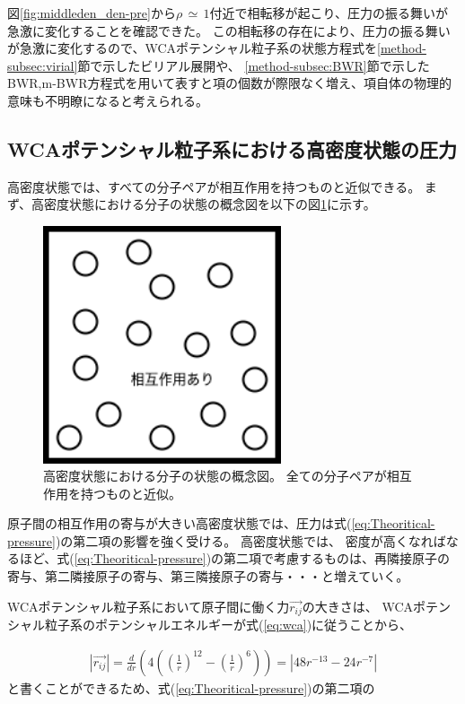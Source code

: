 \documentclass[titlepage]{jsreport}
\begin{document}
{{{図\ref{fig:middleden_den-pre}から$\rho\,{\simeq}\,1$付近で相転移が起こり、圧力の振る舞いが急激に変化することを確認できた。
この相転移の存在により、圧力の振る舞いが急激に変化するので、WCAポテンシャル粒子系の状態方程式を\ref{method-subsec:virial}節で示したビリアル展開や、
\ref{method-subsec:BWR}節で示したBWR,m-BWR方程式を用いて表すと項の個数が際限なく増え、項自体の物理的意味も不明瞭になると考えられる。

\newpage
\subsection{WCAポテンシャル粒子系における高密度状態の圧力}\label{results-subsec:WCA-press-high-density}
高密度状態では、すべての分子ペアが相互作用を持つものと近似できる。
まず、高密度状態における分子の状態の概念図を以下の図\ref{fig:highdensity.png}に示す。

\begin{figure}[htbp]
    \begin{center}
        \includegraphics[width=7cm]{fig/highdensity.png}
    \end{center}
    \caption{高密度状態における分子の状態の概念図。
    全ての分子ペアが相互作用を持つものと近似。}
    \label{fig:highdensity.png}
\end{figure}


原子間の相互作用の寄与が大きい高密度状態では、圧力は式(\ref{eq:Theoritical-pressure})の第二項の影響を強く受ける。
高密度状態では、
密度が高くなればなるほど、式(\ref{eq:Theoritical-pressure})の第二項で考慮するものは、再隣接原子の寄与、第二隣接原子の寄与、第三隣接原子の寄与・・・と増えていく。

WCAポテンシャル粒子系において原子間に働く力$\vec{r_{ij}}$の大きさは、
WCAポテンシャル粒子系のポテンシャルエネルギーが式(\ref{eq:wca})に従うことから、

\large
\begin{eqnarray}
    | {\vec{r_{ij}}} |=\frac{d}{dr}\left(4\left(\left(\frac{1}{r}\right)^{12}-\left(\frac{1}{r}\right)^6\right)\right)=| 48r^{-13}-24r^{-7}| \nonumber
\end{eqnarray}
\normalsize
と書くことができるため、式(\ref{eq:Theoritical-pressure})の第二項の

}}}
\end{document}
